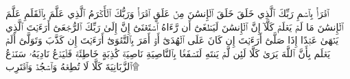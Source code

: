 ٱقۡرَأۡ بِٱسۡمِ رَبِّكَ ٱلَّذِي خَلَقَ
خَلَقَ ٱلۡإِنسَٰنَ مِنۡ عَلَقٍ
ٱقۡرَأۡ وَرَبُّكَ ٱلۡأَكۡرَمُ
ٱلَّذِي عَلَّمَ بِٱلۡقَلَمِ
عَلَّمَ ٱلۡإِنسَٰنَ مَا لَمۡ يَعۡلَمۡ
كَلَّآ إِنَّ ٱلۡإِنسَٰنَ لَيَطۡغَىٰٓ
أَن رَّءَاهُ ٱسۡتَغۡنَىٰٓ
إِنَّ إِلَىٰ رَبِّكَ ٱلرُّجۡعَىٰٓ
أَرَءَيۡتَ ٱلَّذِي يَنۡهَىٰ
عَبۡدًا إِذَا صَلَّىٰٓ
أَرَءَيۡتَ إِن كَانَ عَلَى ٱلۡهُدَىٰٓ
أَوۡ أَمَرَ بِٱلتَّقۡوَىٰٓ
أَرَءَيۡتَ إِن كَذَّبَ وَتَوَلَّىٰٓ
أَلَمۡ يَعۡلَم بِأَنَّ ٱللَّهَ يَرَىٰ
كَلَّا لَئِن لَّمۡ يَنتَهِ لَنَسۡفَعَۢا بِٱلنَّاصِيَةِ
نَاصِيَةٖ كَٰذِبَةٍ خَاطِئَةٖ
فَلۡيَدۡعُ نَادِيَهُۥ
سَنَدۡعُ ٱلزَّبَانِيَةَ
كَلَّا لَا تُطِعۡهُ وَٱسۡجُدۡۤ وَٱقۡتَرِب۩